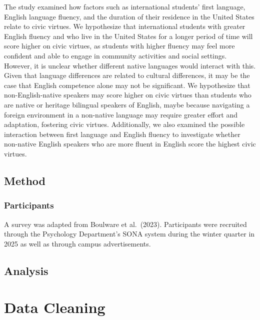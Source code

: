 \documentclass[
  man,
  floatsintext,
  longtable,
  nolmodern,
  notxfonts,
  notimes,
  colorlinks=true,linkcolor=blue,citecolor=blue,urlcolor=blue]{apa7}
\begin{document}
The study examined how factors such as international students' first
language, English language fluency, and the duration of their residence
in the United States relate to civic virtues. We hypothesize that
international students with greater English fluency and who live in the
United States for a longer period of time will score higher on civic
virtues, as students with higher fluency may feel more confident and
able to engage in community activities and social settings. However, it
is unclear whether different native languages would interact with this.
Given that language differences are related to cultural differences, it
may be the case that English competence alone may not be significant. We
hypothesize that non-English-native speakers may score higher on civic
virtues than students who are native or heritage bilingual speakers of
English, maybe because navigating a foreign environment in a non-native
language may require greater effort and adaptation, fostering civic
virtues. Additionally, we also examined the possible interaction between
first language and English fluency to investigate whether non-native
English speakers who are more fluent in English score the highest civic
virtues.

\subsection{Method}\label{method}

\subsubsection{Participants}\label{participants}

A survey was adapted from Boulware et al.~(2023). Participants were
recruited through the Psychology Department's SONA system during the
winter quarter in 2025 as well as through campus advertisements.

\subsection{Analysis}\label{analysis}

\section{Data Cleaning}\label{data-cleaning}
\end{document}
